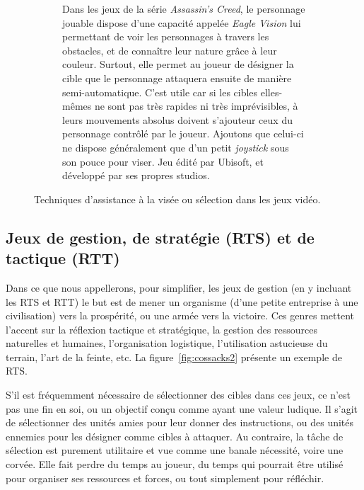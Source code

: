 \begin{figure}[htb]
\begin{subfigure}[t]{0.54\textwidth}
		\caption[Système \emph{Eagle Vision} dans le jeu \emph{Assassin's Creed}] {Dans les jeux de la série \emph{Assassin's Creed}, le personnage jouable dispose d'une capacité appelée \emph{Eagle Vision} lui permettant de voir les personnages à travers les obstacles, et de connaître leur nature grâce à leur couleur. Surtout, elle permet au joueur de désigner la cible que le personnage attaquera ensuite de manière semi-automatique. C'est utile car si les cibles elles-mêmes ne sont pas très rapides ni très imprévisibles, à leurs mouvements absolus doivent s'ajouteur ceux du personnage contrôlé par le joueur. Ajoutons que celui-ci ne dispose généralement que d'un petit \emph{joystick} sous son pouce pour viser. Jeu édité par Ubisoft, et développé par ses propres studios.}
		\label{fig:ac_ev}
		\end{subfigure}
		\label{fig:gamesTargeting}
		\caption{Techniques d'assistance à la visée ou sélection dans les jeux vidéo.}
	\end{figure}
	
	
	\subsection{Jeux de gestion, de stratégie (RTS) et de tactique (RTT)}
	Dans ce que nous appellerons, pour simplifier, les jeux de gestion (en y incluant les RTS et RTT) le but est de mener un organisme (d'une petite entreprise à une civilisation) vers la prospérité, ou une armée vers la victoire. Ces genres mettent l'accent sur la réflexion tactique et stratégique, la gestion des ressources naturelles et humaines, l'organisation logistique, l'utilisation astucieuse du terrain, l'art de la feinte, etc. La figure~\ref{fig:cossacks2} présente un exemple de RTS.
	
	S'il est fréquemment nécessaire de sélectionner des cibles dans ces jeux, ce n'est pas une fin en soi, ou un objectif conçu comme ayant une valeur ludique. Il s'agit de sélectionner des unités amies pour leur donner des instructions, ou des unités ennemies pour les désigner comme cibles à attaquer. Au contraire, la tâche de sélection est purement utilitaire et vue comme une banale nécessité, voire une corvée. Elle fait perdre du temps au joueur, du temps qui pourrait être utilisé pour organiser ses ressources et forces, ou tout simplement pour réfléchir.
	
